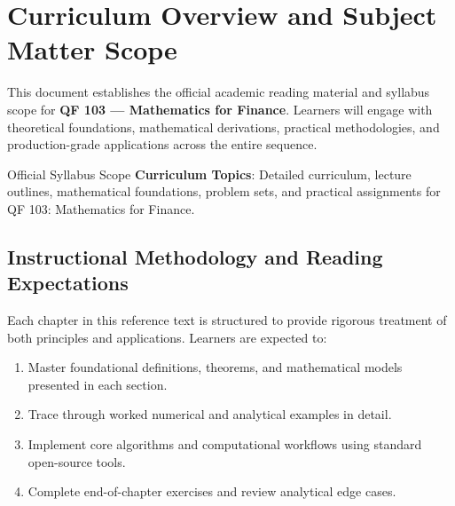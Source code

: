 \section{Curriculum Overview and Subject Matter Scope}

This document establishes the official academic reading material and syllabus scope for \textbf{QF 103 --- Mathematics for Finance}. Learners will engage with theoretical foundations, mathematical derivations, practical methodologies, and production-grade applications across the entire sequence.

\begin{InsightBox}{Official Syllabus Scope}
  \textbf{Curriculum Topics}: Detailed curriculum, lecture outlines, mathematical foundations, problem sets, and practical assignments for QF 103: Mathematics for Finance.
\end{InsightBox}

\subsection{Instructional Methodology and Reading Expectations}

Each chapter in this reference text is structured to provide rigorous treatment of both principles and applications. Learners are expected to:
\begin{enumerate}
  \item Master foundational definitions, theorems, and mathematical models presented in each section.
  \item Trace through worked numerical and analytical examples in detail.
  \item Implement core algorithms and computational workflows using standard open-source tools.
  \item Complete end-of-chapter exercises and review analytical edge cases.
\end{enumerate}

